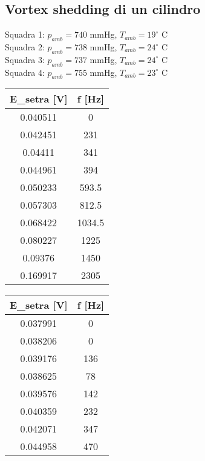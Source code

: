 \newpage\subsection{Vortex shedding di un cilindro}\label{a10}
Squadra 1: $p_{amb}=740$ mmHg, $T_{amb}=19^\circ$ C\\
Squadra 2: $p_{amb}=738$ mmHg, $T_{amb}=24^\circ$ C\\
Squadra 3: $p_{amb}=737$ mmHg, $T_{amb}=24^\circ$ C\\
Squadra 4: $p_{amb}=755$ mmHg, $T_{amb}=23^\circ$ C

\begin{table}[H]
    \centering
    \begin{tabular}{|c|c|}
    \hline
    E\_setra {[}V{]} & f {[}Hz{]} \\ \hline
    0.040511         & 0          \\ \hline
    0.042451         & 231        \\ \hline
    0.04411          & 341        \\ \hline
    0.044961         & 394        \\ \hline
    0.050233         & 593.5      \\ \hline
    0.057303         & 812.5      \\ \hline
    0.068422         & 1034.5     \\ \hline
    0.080227         & 1225       \\ \hline
    0.09376          & 1450       \\ \hline
    0.169917         & 2305       \\ \hline
    \end{tabular}
    \hspace{1cm}
    \centering
    \begin{tabular}{|c|c|}
    \hline
    E\_setra {[}V{]} & f {[}Hz{]} \\ \hline
    0.037991         & 0          \\ \hline
    0.038206         & 0          \\ \hline
    0.039176         & 136        \\ \hline
    0.038625         & 78         \\ \hline
    0.039576         & 142        \\ \hline
    0.040359         & 232        \\ \hline
    0.042071         & 347        \\ \hline
    0.044958         & 470        \\ \hline

\end{tabular}
\end{table}
